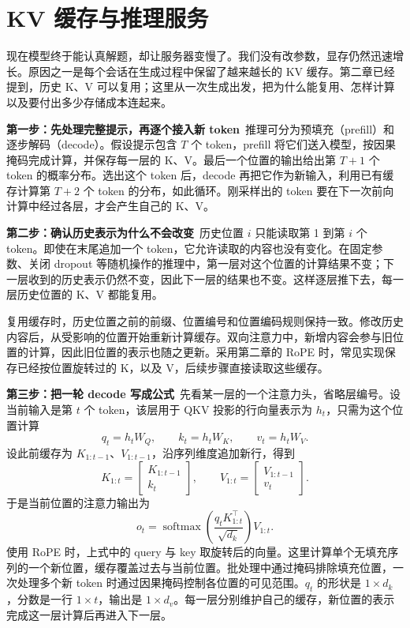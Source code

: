 \section{KV 缓存与推理服务}\label{KV 缓存与推理服务}
现在模型终于能认真解题，却让服务器变慢了。我们没有改参数，显存仍然迅速增长。原因之一是每个会话在生成过程中保留了越来越长的 KV 缓存。第二章已经提到，历史 K、V 可以复用；这里从一次生成出发，把为什么能复用、怎样计算以及要付出多少存储成本连起来。

\textbf{第一步：先处理完整提示，再逐个接入新 token}~推理可分为预填充（prefill）和逐步解码（decode）。假设提示包含 \(T\) 个 token，prefill 将它们送入模型，按因果掩码完成计算，并保存每一层的 K、V。最后一个位置的输出给出第 \(T+1\) 个 token 的概率分布。选出这个 token 后，decode 再把它作为新输入，利用已有缓存计算第 \(T+2\) 个 token 的分布，如此循环。刚采样出的 token 要在下一次前向计算中经过各层，才会产生自己的 K、V。

\textbf{第二步：确认历史表示为什么不会改变}~历史位置 \(i\) 只能读取第 1 到第 \(i\) 个 token。即使在末尾追加一个 token，它允许读取的内容也没有变化。在固定参数、关闭 dropout 等随机操作的推理中，第一层对这个位置的计算结果不变；下一层收到的历史表示仍然不变，因此下一层的结果也不变。这样逐层推下去，每一层历史位置的 K、V 都能复用。

复用缓存时，历史位置之前的前缀、位置编号和位置编码规则保持一致。修改历史内容后，从受影响的位置开始重新计算缓存。双向注意力中，新增内容会参与旧位置的计算，因此旧位置的表示也随之更新。采用第二章的 RoPE 时，常见实现保存已经按位置旋转过的 K，以及 V，后续步骤直接读取这些缓存。

\textbf{第三步：把一轮 decode 写成公式}~先看某一层的一个注意力头，省略层编号。设当前输入是第 \(t\) 个 token，该层用于 QKV 投影的行向量表示为 \(h_t\)，只需为这个位置计算
\[
q_t=h_tW_Q,\qquad k_t=h_tW_K,\qquad v_t=h_tW_V.
\]
设此前缓存为 \(K_{1:t-1}\)、\(V_{1:t-1}\)，沿序列维度追加新行，得到
\[
K_{1:t}=\begin{bmatrix}K_{1:t-1}\\k_t\end{bmatrix},\qquad
V_{1:t}=\begin{bmatrix}V_{1:t-1}\\v_t\end{bmatrix}.
\]
于是当前位置的注意力输出为
\[
o_t=\operatorname{softmax}\left(
\frac{q_tK_{1:t}^{\top}}{\sqrt{d_k}}
\right)V_{1:t}.
\]
使用 RoPE 时，上式中的 query 与 key 取旋转后的向量。这里计算单个无填充序列的一个新位置，缓存覆盖过去与当前位置。批处理中通过掩码排除填充位置，一次处理多个新 token 时通过因果掩码控制各位置的可见范围。\(q_t\) 的形状是 \(1\times d_k\)，分数是一行 \(1\times t\)，输出是 \(1\times d_v\)。每一层分别维护自己的缓存，新位置的表示完成这一层计算后再进入下一层。

